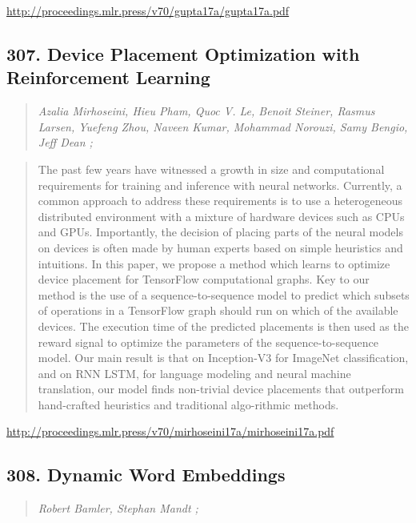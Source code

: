 \documentclass{article}
\begin{document}
\href{http://proceedings.mlr.press/v70/gupta17a/gupta17a.pdf}{http://proceedings.mlr.press/v70/gupta17a/gupta17a.pdf}

\subsection{307. Device Placement Optimization with Reinforcement Learning}

\begin{quote}
\footnotesize{\textit{Azalia Mirhoseini, Hieu Pham, Quoc V. Le, Benoit Steiner, Rasmus Larsen, Yuefeng Zhou, Naveen Kumar, Mohammad Norouzi, Samy Bengio, Jeff Dean ;}}

\end{quote}

\begin{quote}
    The past few years have witnessed a growth in size and computational requirements for training and inference with neural networks. Currently, a common approach to address these requirements is to use a heterogeneous distributed environment with a mixture of hardware devices such as CPUs and GPUs. Importantly, the decision of placing parts of the neural models on devices is often made by human experts based on simple heuristics and intuitions. In this paper, we propose a method which learns to optimize device placement for TensorFlow computational graphs. Key to our method is the use of a sequence-to-sequence model to predict which subsets of operations in a TensorFlow graph should run on which of the available devices. The execution time of the predicted placements is then used as the reward signal to optimize the parameters of the sequence-to-sequence model. Our main result is that on Inception-V3 for ImageNet classification, and on RNN LSTM, for language modeling and neural machine translation, our model finds non-trivial device placements that outperform hand-crafted heuristics and traditional algo-rithmic methods.  
\end{quote}

\href{http://proceedings.mlr.press/v70/mirhoseini17a/mirhoseini17a.pdf}{http://proceedings.mlr.press/v70/mirhoseini17a/mirhoseini17a.pdf}

\subsection{308. Dynamic Word Embeddings}

\begin{quote}
\footnotesize{\textit{Robert Bamler, Stephan Mandt ;}}

\end{quote}
\end{document}
